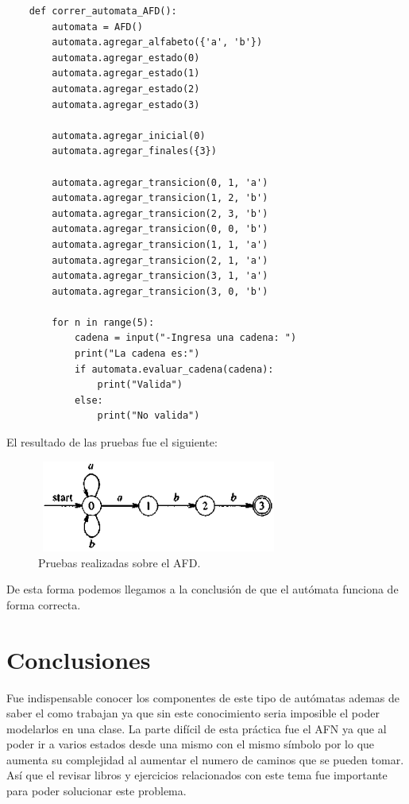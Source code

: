\documentclass[titlepage]{article}
\begin{document}
	\begin{lstlisting}
	def correr_automata_AFD():
		automata = AFD()
		automata.agregar_alfabeto({'a', 'b'})
		automata.agregar_estado(0)
		automata.agregar_estado(1)
		automata.agregar_estado(2)
		automata.agregar_estado(3)
		
		automata.agregar_inicial(0)
		automata.agregar_finales({3})
		
		automata.agregar_transicion(0, 1, 'a')
		automata.agregar_transicion(1, 2, 'b')
		automata.agregar_transicion(2, 3, 'b')
		automata.agregar_transicion(0, 0, 'b')
		automata.agregar_transicion(1, 1, 'a')
		automata.agregar_transicion(2, 1, 'a')
		automata.agregar_transicion(3, 1, 'a')
		automata.agregar_transicion(3, 0, 'b')
		
		for n in range(5):
			cadena = input("-Ingresa una cadena: ")
			print("La cadena es:")
			if automata.evaluar_cadena(cadena):
				print("Valida")
			else:
				print("No valida")
	\end{lstlisting}
	
	El resultado de las pruebas fue el siguiente:
	
	\begin{figure}[H]
		\begin{center}
			\includegraphics[width=8cm, height=3cm]{AFN.png}
			\caption{Pruebas realizadas sobre el AFD.}
			\label{fig:AFD2}
		\end{center}
	\end{figure}

	De esta forma podemos llegamos a la conclusión de que el autómata funciona de forma correcta.
	
	\section{Conclusiones}
	Fue indispensable conocer los componentes de este tipo de autómatas ademas de saber el como trabajan 
	ya que sin este conocimiento seria imposible el poder modelarlos en una clase. La parte difícil de esta 
	práctica fue el AFN ya que al poder ir a varios estados desde una mismo con el mismo símbolo por lo que 
	aumenta su complejidad al aumentar el numero de caminos que se pueden tomar. 
	Así que el revisar libros y ejercicios relacionados con este tema fue importante para poder solucionar este problema.
	 
	
\end{document}
